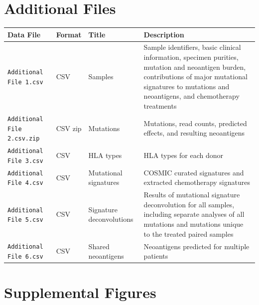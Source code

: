 
\section*{Additional Files}

\setcounter{equation}{0}
\setcounter{figure}{0}
\setcounter{table}{0}
\makeatletter
\renewcommand{\theequation}{S\arabic{equation}}
\renewcommand{\thefigure}{S\arabic{figure}}

\begin{center}
    \begin{tabular}{ | l | l | l | p{5cm} |}
    \hline
    \textbf{Data File} & \textbf{Format} & \textbf{Title} & \textbf{Description} \\ \hline
    \texttt{Additional File 1.csv} & CSV & Samples & Sample identifiers, basic clinical information, specimen purities, mutation and neoantigen burden, contributions of major mutational signatures to mutations and neoantigens, and chemotherapy treatments \\ \hline

    \texttt{Additional File 2.csv.zip} & CSV zip & Mutations & Mutations, read counts, predicted effects, and resulting neoantigens \\ \hline
    
    \texttt{Additional File 3.csv} & CSV & HLA types & HLA types for each donor \\ \hline
    
    \texttt{Additional File 4.csv} & CSV & Mutational signatures & COSMIC curated signatures and extracted chemotherapy signatures \\ \hline

    \texttt{Additional File 5.csv} & CSV & Signature deconvolutions & Results of mutational signature deconvolution for all samples, including separate analyses of all mutations and mutations unique to the treated paired samples  \\ \hline
    
    \texttt{Additional File 6.csv} & CSV & Shared neoantigens & Neoantigens predicted for multiple patients  \\ \hline
    \end{tabular}
\end{center}


\section*{Supplemental Figures}

